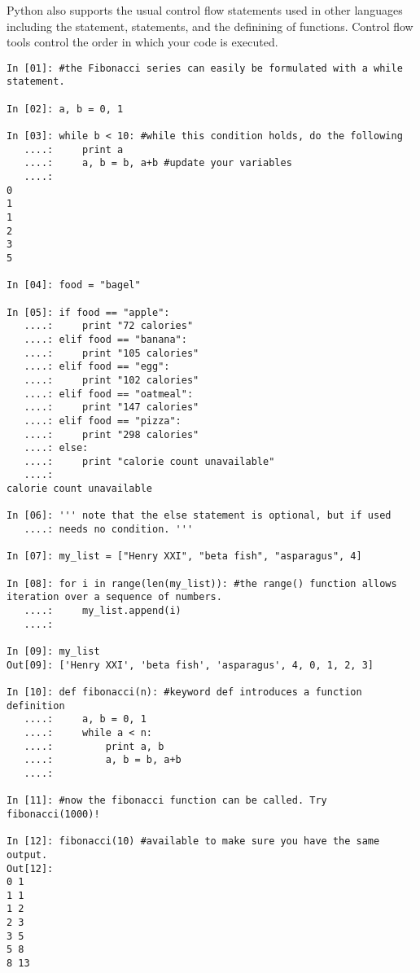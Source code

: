 \begin{example}
Python also supports the usual control flow statements used in other languages
including the  statement,  statements, and the definining of functions. 
Control flow tools control the order in which your code is executed. 
\begin{lstlisting}
In [01]: #the Fibonacci series can easily be formulated with a while statement.

In [02]: a, b = 0, 1

In [03]: while b < 10: #while this condition holds, do the following
   ....:     print a
   ....:     a, b = b, a+b #update your variables
   ....:     
0
1
1
2
3
5

In [04]: food = "bagel"

In [05]: if food == "apple":
   ....:     print "72 calories"
   ....: elif food == "banana":
   ....:     print "105 calories"
   ....: elif food == "egg":
   ....:     print "102 calories"
   ....: elif food == "oatmeal":
   ....:     print "147 calories"
   ....: elif food == "pizza":
   ....:     print "298 calories"
   ....: else: 
   ....:     print "calorie count unavailable"
   ....:     
calorie count unavailable

In [06]: ''' note that the else statement is optional, but if used
   ....: needs no condition. '''
   
In [07]: my_list = ["Henry XXI", "beta fish", "asparagus", 4]

In [08]: for i in range(len(my_list)): #the range() function allows iteration over a sequence of numbers. 
   ....:     my_list.append(i)
   ....:     

In [09]: my_list
Out[09]: ['Henry XXI', 'beta fish', 'asparagus', 4, 0, 1, 2, 3]

In [10]: def fibonacci(n): #keyword def introduces a function definition
   ....:     a, b = 0, 1
   ....:     while a < n:
   ....:         print a, b
   ....:         a, b = b, a+b
   ....:         

In [11]: #now the fibonacci function can be called. Try fibonacci(1000)!

In [12]: fibonacci(10) #available to make sure you have the same output.
Out[12]:
0 1
1 1
1 2
2 3
3 5
5 8
8 13

\end{lstlisting}
\end{example}

